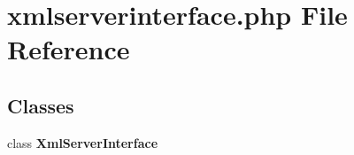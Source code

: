 \section{xmlserverinterface.php File Reference}
\label{xmlserverinterface_8php}


\subsection*{Classes}
\begin{CompactItemize}
\item 
class {\bf Xml\-Server\-Interface}
\end{CompactItemize}
